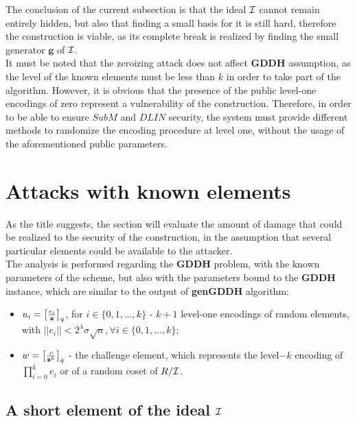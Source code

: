 The conclusion of the current subsection is that the ideal $\mathcal{I}$ cannot remain entirely hidden, but also that finding a small basis for it is still hard, therefore the construction is viable, as its complete break is realized by finding the small generator $\textbf{g}$ of $\mathcal{I}$.\\



It must be noted that the zeroizing attack does not affect \textbf{GDDH} assumption, as the level of the known elements must be less than $k$ in order to take part of the algorithm. However, it is obvious that the presence of the public level-one encodings of zero represent a vulnerability of the construction. Therefore, in order to be able to ensure $SubM$ and $DLIN$ security, the system must provide different methods to randomize the encoding procedure at level one, without the usage of the aforementioned public parameters.

\section{Attacks with known elements}

As the title suggests, the section will evaluate the amount of damage that could be realized to the security of the construction, in the assumption that several particular elements could be available to the attacker.\\

The analysis is performed regarding the \textbf{GDDH} problem, with the known parameters of the scheme, but also with the parameters bound to the \textbf{GDDH} instance, which are similar to the output of \textbf{genGDDH} algorithm:

\begin{itemize}
	\item $u_i = \big[ \frac{e_i}{\textbf{z}} \big]_q$, for $i \in \{0,1,...,k\}$ - $k+1$ level-one encodings of random elements, with $||e_i|| < 2^\lambda \sigma \sqrt{n}, \forall i \in \{0,1,...,k\}$;
	
	\item $w = \big[ \frac{c}{\textbf{z}^k} \big]_q$ - the challenge element, which represents the level$-k$ encoding of $\displaystyle{\prod_{i = 0}^{k} e_i}$ or of a random coset of $R/\mathcal{I}$.
\end{itemize}

\subsection {A short element of the ideal $\mathcal{I}$}


